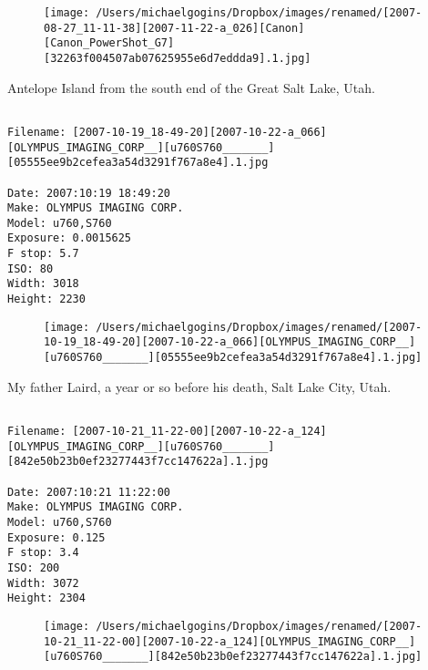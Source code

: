 \begin{figure}
\texttt{[image: /Users/michaelgogins/Dropbox/images/renamed/[2007-08-27\_11-11-38][2007-11-22-a\_026][Canon][Canon\_PowerShot\_G7][32263f004507ab07625955e6d7eddda9].1.jpg]}
\end{figure}
    
\clearpage
\onecolumn
\noindent Antelope Island from the south end of the Great Salt Lake, Utah.
\noindent
\begin{lstlisting}

Filename: [2007-10-19_18-49-20][2007-10-22-a_066][OLYMPUS_IMAGING_CORP__][u760S760_______][05555ee9b2cefea3a54d3291f767a8e4].1.jpg

Date: 2007:10:19 18:49:20
Make: OLYMPUS IMAGING CORP.  
Model: u760,S760       
Exposure: 0.0015625
F stop: 5.7
ISO: 80
Width: 3018
Height: 2230
\end{lstlisting}
\clearpage

\begin{figure}
\texttt{[image: /Users/michaelgogins/Dropbox/images/renamed/[2007-10-19\_18-49-20][2007-10-22-a\_066][OLYMPUS\_IMAGING\_CORP\_\_][u760S760\_\_\_\_\_\_\_][05555ee9b2cefea3a54d3291f767a8e4].1.jpg]}
\end{figure}
    
\clearpage
\onecolumn
\noindent My father Laird, a year or so before his death, Salt Lake City, Utah.
\noindent
\begin{lstlisting}

Filename: [2007-10-21_11-22-00][2007-10-22-a_124][OLYMPUS_IMAGING_CORP__][u760S760_______][842e50b23b0ef23277443f7cc147622a].1.jpg

Date: 2007:10:21 11:22:00
Make: OLYMPUS IMAGING CORP.  
Model: u760,S760       
Exposure: 0.125
F stop: 3.4
ISO: 200
Width: 3072
Height: 2304
\end{lstlisting}
\clearpage

\begin{figure}
\texttt{[image: /Users/michaelgogins/Dropbox/images/renamed/[2007-10-21\_11-22-00][2007-10-22-a\_124][OLYMPUS\_IMAGING\_CORP\_\_][u760S760\_\_\_\_\_\_\_][842e50b23b0ef23277443f7cc147622a].1.jpg]}
\end{figure}
    
